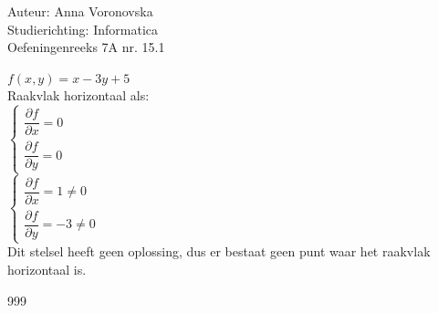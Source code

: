 \documentclass[a4paper]{article}
\begin{document}
  
\noindent \large Auteur: Anna Voronovska \\
\noindent \large Studierichting: Informatica\\
\noindent \large Oefeningenreeks 7A nr. 15.1\\

\medskip

\normalsize

$f(x,y) = x-3y+5$\\

Raakvlak horizontaal als:\\

$\left\{ \begin{array}{l} \dfrac{\partial f}{\partial x} = 0 \\ \dfrac{\partial f}{\partial y} = 0 \end{array} \right.$\\

$\left\{ \begin{array}{l} \dfrac{\partial f}{\partial x} = 1 \neq 0 \\ \dfrac{\partial f}{\partial y} = -3 \neq 0 \end{array} \right.$\\

Dit stelsel heeft geen oplossing, dus er bestaat geen punt waar het raakvlak horizontaal is.

\begin{thebibliography}{999}
\end{thebibliography}
\end{document}
